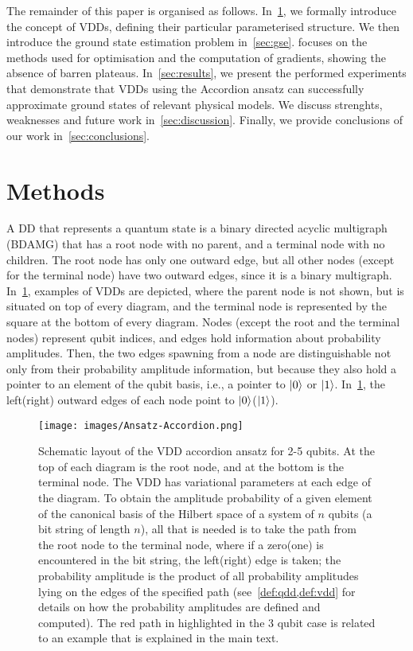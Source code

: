 \documentclass{ieeeaccess}
\begin{document}
The remainder of this paper is organised as follows. In~\cref{sec:methods}, we formally introduce the concept of VDDs, defining their particular parameterised structure.
We then introduce the ground state estimation problem in~\cref{sec:gse}.
 focuses on the methods used for optimisation and the computation of gradients, showing the absence of barren plateaus.
In~\cref{sec:results}, we present the performed experiments that demonstrate that VDDs using the Accordion ansatz can successfully approximate ground states of relevant physical models.
We discuss strenghts, weaknesses and future work in~\cref{sec:discussion}.
Finally, we provide conclusions of our work in~\cref{sec:conclusions}.

\section{Methods}\label{sec:methods}

A DD that represents a quantum state is a binary directed acyclic multigraph (BDAMG) that has a root node with no parent, and a terminal node with no children.
The root node has only one outward edge, but all other nodes (except for the terminal node) have two outward edges, since it is a binary multigraph.
In~\cref{fig:accordion}, examples of VDDs are depicted, where the parent node is not shown, but is situated on top of every diagram, and the terminal node is represented by the square at the bottom of every diagram.
Nodes (except the root and the terminal nodes) represent qubit indices, and edges hold information about probability amplitudes.
Then, the two edges spawning from a node are distinguishable not only from their probability amplitude information, but because they also hold a pointer to an element of the qubit basis, i.e., a pointer to $\ket{0}$ or $\ket{1}$.
In~\cref{fig:accordion}, the left(right) outward edges of each node point to $\ket{0}$($\ket{1}$).

\begin{figure}
    \centering
    \texttt{[image: images/Ansatz-Accordion.png]}
    \caption{Schematic layout of the VDD accordion ansatz for 2-5 qubits. At the top of each diagram is the root node, and at the bottom is the terminal node. The VDD has variational parameters at each edge of the diagram. To obtain the amplitude probability of a given element of the canonical basis of the Hilbert space of a system of $n$ qubits (a bit string of length $n$), all that is needed is to take the path from the root node to the terminal node, where if a zero(one) is encountered in the bit string, the left(right) edge is taken; the probability amplitude is the product of all probability amplitudes lying on the edges of the specified path (see~\cref{def:qdd,def:vdd} for details on how the probability amplitudes are defined and computed). The red path in highlighted in the 3 qubit case is related to an example that is explained in the main text.}
    \label{fig:accordion}
\end{figure}
\end{document}
